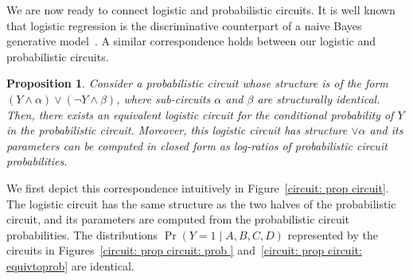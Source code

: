 \documentclass[letterpaper]{article} %
\newtheorem{proposition}[corollary]{Proposition}
\begin{document}
We are now ready to connect logistic and probabilistic circuits. It is well known that logistic regression is the discriminative counterpart of a naive Bayes generative model~\cite{ng2002discriminative}. A similar correspondence holds between our logistic and probabilistic circuits.
\begin{proposition}
\label{prop: correspondence}
Consider a probabilistic circuit whose structure is of the form $(Y \land \alpha) \lor (\neg Y \land \beta)$, where sub-circuits $\alpha$ and $\beta$ are structurally identical.
Then, there exists an equivalent logistic circuit for the conditional probability of $Y$ in the probabilistic circuit. Moreover, this logistic circuit has structure $\lor \alpha$ and its parameters can be computed in closed form as log-ratios of probabilistic circuit probabilities.
\end{proposition}

We first depict this correspondence intuitively in Figure~\ref{circuit: prop circuit}. The logistic circuit has the same structure as the two halves of the probabilistic circuit, and its parameters are computed from the probabilistic circuit probabilities. The distributions $\Pr(Y=1 \mid A,B,C,D)$ represented by the circuits in Figures~\ref{circuit: prop circuit: prob } and~\ref{circuit: prop circuit: equivtoprob} are identical.
\end{document}
